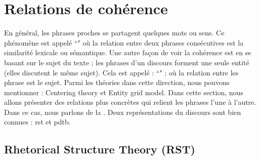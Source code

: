 \documentclass{KodeBook}
\begin{document}
\section{Relations de cohérence}

En général, les phrases proches se partagent quelques mots ou sens. 
Ce phénomène est appelé ``" où la relation entre deux phrases consécutives est la similarité lexicale ou sémantique.
Une autre façon de voir la cohérence est en se basant sur le sujet du texte ; les phrases d'un discours forment une seule entité (elles discutent le même sujet). 
Cela est appelé : ``" ; où la relation entre les phrase est le sujet. 
Parmi les théories dans cette direction, nous pouvons mentionner : Centering theory et Entity grid model. 
Dans cette section, nous allons présenter  des relations plus concrètes qui relient les phrases l'une à l'autre. 
Dans ce cas, nous parlons de la . 
Deux représentations du discours sont bien connues : \ac{rst} et \ac{pdtb}.

\vfill

\subsection{Rhetorical Structure Theory (RST)}
\end{document}
